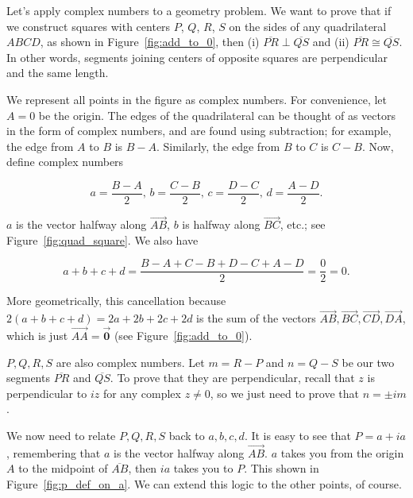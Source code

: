 \documentclass[../textbook.tex]{subfiles}
\begin{document}
\noindent Let’s apply complex numbers to a geometry problem. We want to prove that if we construct squares with centers $P$, $Q$, $R$, $S$ on the sides of any quadrilateral $ABCD$, as shown in Figure~\ref{fig:add_to_0}, then (i) $\overline{PR} \perp \overline{QS}$ and (ii) $\overline{PR} \cong \overline{QS}$. In other words, segments joining centers of opposite squares are perpendicular and the same length.

We represent all points in the figure as complex numbers. For convenience, let $A=0$ be the origin. The edges of the quadrilateral can be thought of as vectors in the form of complex numbers, and are found using subtraction; for example, the edge from $A$ to $B$ is $B-A$. Similarly, the edge from $B$ to $C$ is $C-B$. Now, define complex numbers

$$a=\frac{B-A}{2},\, b=\frac{C-B}{2},\, c = \frac{D-C}{2},\, d = \frac{A-D}{2}.$$

\noindent$a$ is the vector halfway along $\overrightarrow{AB}$, $b$ is halfway along $\overrightarrow{BC}$, etc.; see Figure~\ref{fig:quad_square}. We also have

$$a+b+c+d=\frac{B-A+C-B+D-C+A-D}{2}=\frac{0}{2}=0.$$

\noindent More geometrically, this cancellation because $2(a+b+c+d)=2a+2b+2c+2d$ is the sum of the vectors $\overrightarrow{AB}, \overrightarrow{BC}, \overrightarrow{CD}, \overrightarrow{DA}$, which is just $\overrightarrow{AA}=\overrightarrow{\mathbf{0}}$ (see Figure~\ref{fig:add_to_0}).

$P,Q,R,S$ are also complex numbers. Let $m=R-P$ and $n = Q-S$ be our two segments $\overline{PR}$ and $\overline{QS}$. To prove that they are perpendicular, recall that $z$ is perpendicular to $iz$ for any complex $z\neq 0$, so we just need to prove that $n=\pm im$.

We now need to relate $P,Q,R,S$ back to $a,b,c,d$. It is easy to see that $P = a+ia$, remembering that $a$ is the vector halfway along $\overrightarrow{AB}$. $a$ takes you from the origin $A$ to the midpoint of $\overline{AB}$, then $ia$ takes you to $P$. This shown in Figure~\ref{fig:p_def_on_a}. We can extend this logic to the other points, of course.
\end{document}
